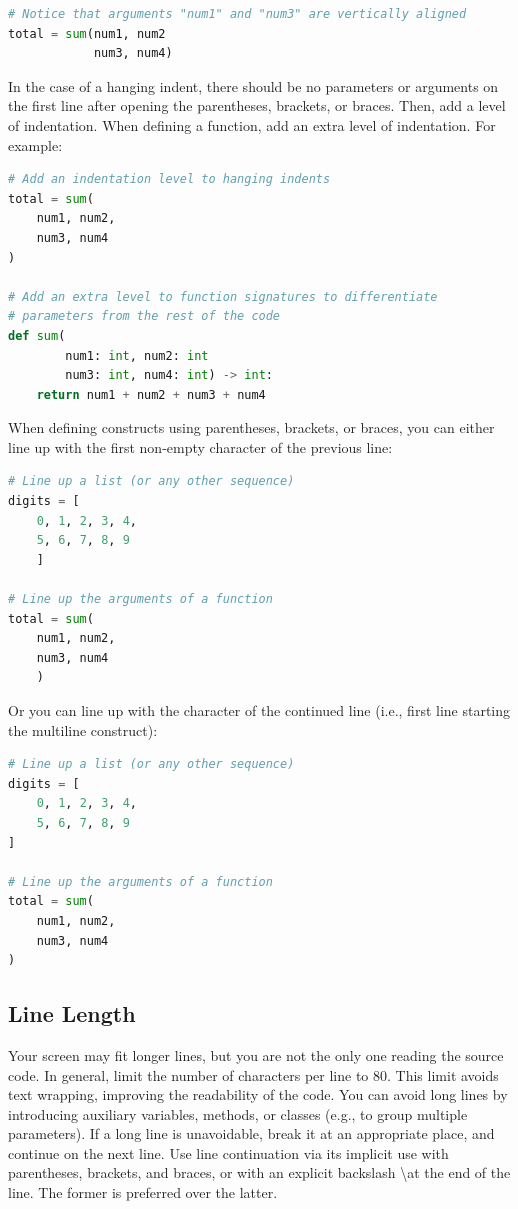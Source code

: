 \documentclass{tufte-handout}
\begin{document}
\begin{lstlisting}[numbers=none,language=python]
# Notice that arguments "num1" and "num3" are vertically aligned
total = sum(num1, num2
            num3, num4)
\end{lstlisting}

In the case of a hanging indent, there should be no parameters or arguments on the first line after opening the parentheses, brackets, or braces.
Then, add a level of indentation.
When defining a function, add an extra level of indentation.
For example:

\begin{lstlisting}[numbers=none,language=python]
# Add an indentation level to hanging indents
total = sum(
    num1, num2,
    num3, num4
)

# Add an extra level to function signatures to differentiate 
# parameters from the rest of the code
def sum(
        num1: int, num2: int
        num3: int, num4: int) -> int:
    return num1 + num2 + num3 + num4
\end{lstlisting}

When defining constructs using parentheses, brackets, or braces, you can either line up with the first non-empty character of the previous line:

\begin{lstlisting}[numbers=none,language=python]
# Line up a list (or any other sequence)
digits = [
    0, 1, 2, 3, 4,
    5, 6, 7, 8, 9 
    ]
    
# Line up the arguments of a function
total = sum(
    num1, num2,
    num3, num4
    )
\end{lstlisting}

Or you can line up with the character of the continued line (i.e., first line starting the multiline construct):

\begin{lstlisting}[numbers=none,language=python]
# Line up a list (or any other sequence)
digits = [
	0, 1, 2, 3, 4,
	5, 6, 7, 8, 9 
]
	
# Line up the arguments of a function
total = sum(
	num1, num2,
	num3, num4
)
\end{lstlisting}

\subsection{Line Length}
Your screen may fit longer lines, but you are not the only one reading the source code.
In general, limit the number of characters per line to 80.
This limit avoids text wrapping, improving the readability of the code.
You can avoid long lines by introducing auxiliary variables, methods, or classes (e.g., to group multiple parameters).
If a long line is unavoidable, break it at an appropriate place, and continue on the next line.
Use line continuation via its implicit use with parentheses, brackets, and braces, or with an explicit backslash \textbackslash  at the end of the line.
The former is preferred over the latter.
\end{document}
